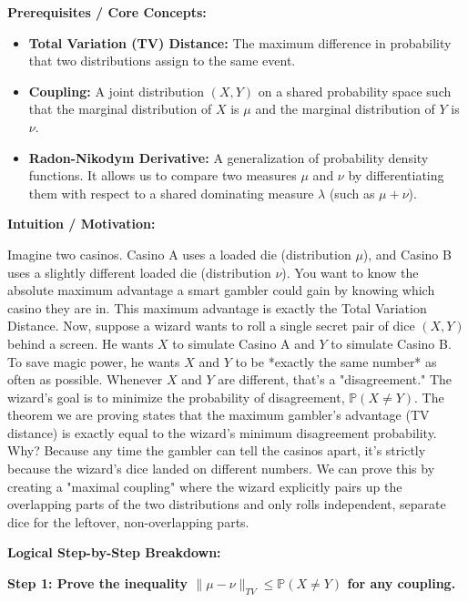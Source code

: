 \begin{solution}
\textbf{Prerequisites / Core Concepts:}
\begin{itemize}
    \item \textbf{Total Variation (TV) Distance:} The maximum difference in probability that two distributions assign to the same event.
    \item \textbf{Coupling:} A joint distribution $(X,Y)$ on a shared probability space such that the marginal distribution of $X$ is $\mu$ and the marginal distribution of $Y$ is $\nu$.
    \item \textbf{Radon-Nikodym Derivative:} A generalization of probability density functions. It allows us to compare two measures $\mu$ and $\nu$ by differentiating them with respect to a shared dominating measure $\lambda$ (such as $\mu + \nu$).
\end{itemize}

\textbf{Intuition / Motivation:}

Imagine two casinos. Casino A uses a loaded die (distribution $\mu$), and Casino B uses a slightly different loaded die (distribution $\nu$). You want to know the absolute maximum advantage a smart gambler could gain by knowing which casino they are in. This maximum advantage is exactly the Total Variation Distance.
Now, suppose a wizard wants to roll a single secret pair of dice $(X,Y)$ behind a screen. He wants $X$ to simulate Casino A and $Y$ to simulate Casino B. To save magic power, he wants $X$ and $Y$ to be *exactly the same number* as often as possible. 
Whenever $X$ and $Y$ are different, that's a "disagreement." The wizard's goal is to minimize the probability of disagreement, $\mathbb{P}(X \neq Y)$.
The theorem we are proving states that the maximum gambler's advantage (TV distance) is exactly equal to the wizard's minimum disagreement probability. 
Why? Because any time the gambler can tell the casinos apart, it's strictly because the wizard's dice landed on different numbers. We can prove this by creating a "maximal coupling" where the wizard explicitly pairs up the overlapping parts of the two distributions and only rolls independent, separate dice for the leftover, non-overlapping parts.

\textbf{Logical Step-by-Step Breakdown:}

\textbf{Step 1: Prove the inequality $\|\mu - \nu\|_{TV} \leq \mathbb{P}(X \neq Y)$ for any coupling.}


\end{solution}
